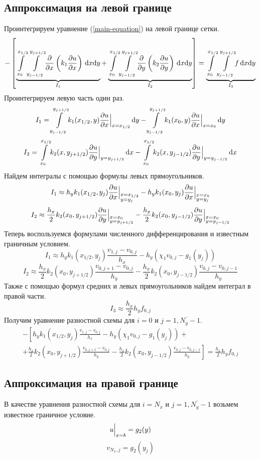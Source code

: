 \subsection{Аппроксимация на левой границе}
Проинтегрируем уравнение (\ref{main-equation}) на левой границе сетки.
\[
  - \left[
  \underbrace{ \int\limits_{x_{0}}^{x_{1/2}}\int\limits_{y_{j-1/2}}^{y_{j+1/2}} \! \pdv{x}\left( k_1 \pdv{u}{x} \right) \, \dd x \dd y }_{I_1} +
  \underbrace{ \int\limits_{x_{0}}^{x_{1/2}}\int\limits_{y_{j-1/2}}^{y_{j+1/2}} \! \pdv{y}\left( k_2 \pdv{u}{y} \right) \, \dd x \dd y }_{I_2}
  \right] =
  \underbrace{ \int\limits_{x_{0}}^{x_{1/2}}\int\limits_{y_{j-1/2}}^{y_{j+1/2}} \! f \, \dd x \dd y }_{I_3}
\]
Проинтегрируем левую часть один раз.
\[ I_1 = \int\limits_{y_{j-1/2}}^{y_{j+1/2}} \! k_1(x_{1/2},y) \pdv{u}{x} \Big\vert_{x = x_{1/2}} \, \dd y - \int\limits_{y_{j-1/2}}^{y_{j+1/2}} \! k_1(x_{0},y) \pdv{u}{x} \Big\vert_{x = x_{0}} \, \dd y \]
\[ I_2 = \int\limits_{x_{0}}^{x_{1/2}} \! k_2(x,y_{j+1/2}) \pdv{u}{y} \Big\vert_{y = y_{j+1/2}} \, \dd x - \int\limits_{x_{0}}^{x_{1/2}} \! k_2(x,y_{j-1/2}) \pdv{u}{y} \Big\vert_{y = y_{j-1/2}} \, \dd x \]
Найдем интегралы с помощью формулы левых прямоугольников.
\[ I_1 \approx h_y k_1(x_{1/2},y_{j}) \pdv{u}{x} \Big\vert_{\begin{subarray}{l} x = x_{1/2} \\ y = y_{j} \end{subarray}} - h_y k_1(x_{0},y_{j}) \pdv{u}{x} \Big\vert_{\begin{subarray}{l} x = x_{0} \\ y = y_{j} \end{subarray}} \]
\[ I_2 \approx \frac{h_x}{2} k_2(x_{0},y_{j+1/2}) \pdv{u}{y} \Big\vert_{\begin{subarray}{l} x = x_{0} \\ y = y_{j+1/2} \end{subarray}} - \frac{h_x}{2} k_2(x_{0},y_{j-1/2}) \pdv{u}{y} \Big\vert_{\begin{subarray}{l} x = x_{0} \\ y = y_{j-1/2} \end{subarray}} \]
Теперь воспользуемся формулами численного дифференцирования и известным граничным условием.
\[ I_1 \approx h_y k_1(x_{1/2},y_{j}) \frac{v_{1,j} - v_{0,j}}{h_x} - h_y \left( \chi_1 v_{0,j} - g_1(y_{j}) \right) \]
\[ I_2 \approx \frac{h_x}{2} k_2(x_{0},y_{j+1/2}) \frac{v_{0,j+1} - v_{0,j}}{h_y} - \frac{h_x}{2} k_2(x_{0},y_{j-1/2}) \frac{v_{0,j} - v_{0,j-1}}{h_y} \]
Также с помощью формул средних и левых прямоугольников найдем интеграл в правой части.
\[ I_3 \approx \frac{h_x}{2} h_y f_{0,j} \]
Получим уравнение разностной схемы для $i = 0$ и $j = \overline{1,N_y-1}$.
\begin{multline*}
  - \left[
  h_y k_1(x_{1/2},y_{j}) \frac{v_{1,j} - v_{0,j}}{h_x} - h_y \left( \chi_1 v_{0,j} - g_1(y_{j}) \right) + \right. \\
  \left. +
  \frac{h_x}{2} k_2(x_{0},y_{j+1/2}) \frac{v_{0,j+1} - v_{0,j}}{h_y} - \frac{h_x}{2} k_2(x_{0},y_{j-1/2}) \frac{v_{0,j} - v_{0,j-1}}{h_y}
  \right] =
  \frac{h_x}{2} h_y f_{0,j}
\end{multline*}

\subsection{Аппроксимация на правой границе}
В качестве уравнения разностной схемы для $i = N_x$ и $j = \overline{1,N_y-1}$ возьмем
известное граничное условие.
\[ u \Big\vert_{x = b} = g_2(y) \]
\[ v_{N_x,j} = g_2(y_j) \]

